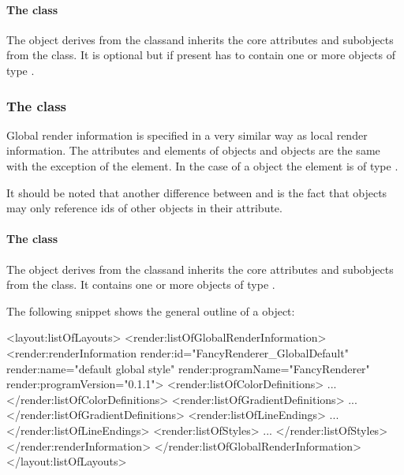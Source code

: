\paragraph{The  class}
\label{listoflocalstyles-class}

The \ListOfLocalStyles object derives from the  classand inherits
the core attributes and subobjects from the  class. It is optional but 
if present has to contain one or more objects of type \LocalStyle.


\subsubsection{The  class}
\label{globalrenderinformation-class}

Global render information is specified in a very similar way as local render information. The attributes and elements of \GlobalRenderInformation objects and 
\LocalRenderInformation objects are the same with the exception of the  element. In the case of a \GlobalRenderInformation object the  element is of type \ListOfGlobalStyles.

It should be noted that another difference between \GlobalRenderInformation and \LocalRenderInformation is the 
fact that \GlobalRenderInformation objects may only reference ids of other 
\GlobalRenderInformation objects in their  attribute. 

\paragraph{The  class}
\label{listofglobalstyles-class}

The \ListOfGlobalStyles object derives from the  classand inherits
the core attributes and subobjects from the  class. It
contains one or more objects of type \GlobalStyle.

\vspace{0.25cm}
The following snippet shows the general outline of a \ListOfGlobalRenderInformation object:


{\footnotesize
\begin{example}
<layout:listOfLayouts>
   <render:listOfGlobalRenderInformation>
      <render:renderInformation render:id="FancyRenderer_GlobalDefault" 
                         render:name="default global style" 
                         render:programName="FancyRenderer" 
                         render:programVersion="0.1.1">
        <render:listOfColorDefinitions>
             ...
        </render:listOfColorDefinitions>
        <render:listOfGradientDefinitions>
             ...
        </render:listOfGradientDefinitions>
        <render:listOfLineEndings>
             ...
        </render:listOfLineEndings>
        <render:listOfStyles>
             ...
        </render:listOfStyles>
      </render:renderInformation>
   </render:listOfGlobalRenderInformation>
</layout:listOfLayouts>
\end{example}
}
